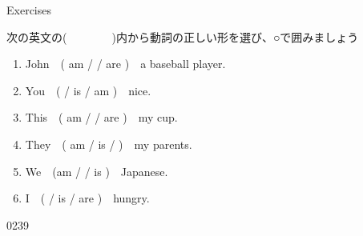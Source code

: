 \documentclass[aspectratio=169,xcolor={dvipsnames,table}]{beamer}
\begin{document}
\begin{frame}[plain]{Exercises}
 
{\small 次の英文の(~~~~~~~~)内から動詞の正しい形を選び、○で囲みましょう}

\begin{enumerate}
 \item John~~( am /  / are )~~a baseball player.
 \item You~~(  / is / am )~~nice.
 \item This~~( am /  / are )~~my cup.
 \item They~~( am / is /  )~~my parents.
 \item We~~(am /  / is )~~Japanese.
 \item I~~(  / is / are )~~hungry.
\end{enumerate}

\mbox{}\hfill{\tiny 0239}\,{\scriptsize {}}

\end{frame}
\end{document}
